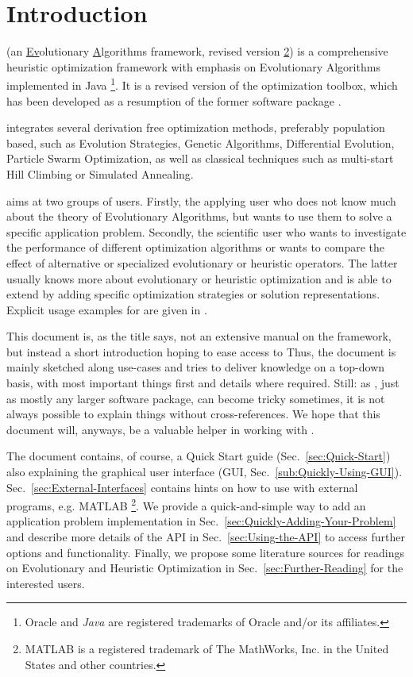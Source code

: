 \chapter{Introduction}

\emph{} (an \uline{Ev}olutionary \uline{A}lgorithms
framework, revised version \uline{2}) is a comprehensive heuristic
optimization framework with emphasis on Evolutionary Algorithms implemented
in Java%
\footnote{Oracle and \emph{Java} are registered trademarks of Oracle and/or its affiliates.%
}. It is a revised version of the  \cite{JOptDocumentation}
optimization toolbox, which has been developed as a resumption of
the former  software package \cite{Wakunda97EvA}.

 integrates several derivation free optimization methods,
preferably population based, such as Evolution Strategies, Genetic
Algorithms, Differential Evolution, Particle Swarm Optimization, as
well as classical techniques such as multi-start Hill Climbing or
Simulated Annealing.

 aims at two groups of users. Firstly, the applying user
who does not know much about the theory of Evolutionary Algorithms,
but wants to use them to solve a specific application problem. Secondly,
the scientific user who wants to investigate the performance of different
optimization algorithms or wants to compare the effect of alternative
or specialized evolutionary or heuristic operators. The latter usually
knows more about evolutionary or heuristic optimization and is able
to extend  by adding specific optimization strategies or
solution representations. Explicit usage examples for are
given in \cite{Kron10EvA2}.

This document is, as the title says, not an extensive manual on the
 framework, but instead a short introduction hoping to
ease access to  Thus, the document is mainly sketched
along use-cases and tries to deliver knowledge on a top-down basis,
with most important things first and details where required. Still:
as , just as mostly any larger software package, can become
tricky sometimes, it is not always possible to explain things without
cross-references. We hope that this document will, anyways, be a valuable
helper in working with .

The document contains, of course, a Quick Start guide (Sec.~\ref{sec:Quick-Start})
also explaining the graphical user interface (GUI, Sec.~\ref{sub:Quickly-Using-GUI}).
Sec.~\ref{sec:External-Interfaces} contains hints on how to use
 with external programs, e.g. MATLAB%
\footnote{MATLAB is a registered trademark of The MathWorks, Inc. in the United
States and other countries.%
}. We provide a quick-and-simple way to add an application problem
implementation in Sec.~\ref{sec:Quickly-Adding-Your-Problem} and
describe more details of the API in Sec.~\ref{sec:Using-the-API}
to access further options and functionality. Finally, we propose some
literature sources for readings on Evolutionary and Heuristic Optimization
in Sec.~\ref{sec:Further-Reading} for the interested users.

\newpage{}